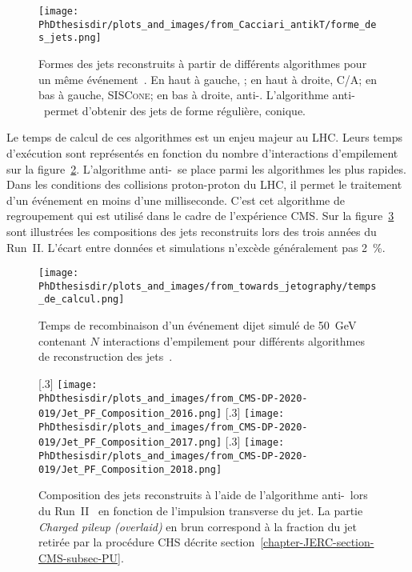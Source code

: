 \begin{figure}[h]
\centering
\texttt{[image: \\PhDthesisdir/plots\_and\_images/from\_Cacciari\_antikT/forme\_des\_jets.png]}
\caption[Formes des jets reconstruits à partir de différents algorithmes.]{Formes des jets reconstruits à partir de différents algorithmes pour un même événement~\cite{Cacciari_antikT}. En haut à gauche, \kT; en haut à droite, C/A; en bas à gauche, \textsc{SISCone}; en bas à droite, anti-\kT. L'algorithme anti-\kT\ permet d'obtenir des jets de forme régulière, conique.}
\label{fig-chapter-JERC-section-jets_reco-subsec-algo-examples}
\end{figure}
\par Le temps de calcul de ces algorithmes est un enjeu majeur au LHC.
Leurs temps d'exécution sont représentés en fonction du nombre d'interactions d'empilement sur la figure~\ref{fig-chapter-JERC-section-jets_reco-subsec-algo-perfs}.
L'algorithme anti-\kT\ se place parmi les algorithmes les plus rapides.
Dans les conditions des collisions proton-proton du LHC, il permet le traitement d'un événement en moins d'une milliseconde.
C'est cet algorithme de regroupement qui est utilisé dans le cadre de l'expérience CMS.
Sur la figure~\ref{fig-Jet_PF_Composition_RunII} sont illustrées les compositions des jets reconstruits lors des trois années du Run~II. L'écart entre données et simulations n'excède généralement pas \SI{2}{\%}.
\begin{figure}[h]
\centering
\texttt{[image: \\PhDthesisdir/plots\_and\_images/from\_towards\_jetography/temps\_de\_calcul.png]}
\caption[Temps de recombinaison d'un événement dijet.]{Temps de recombinaison d'un événement dijet simulé de \SI{50}{\GeV} contenant $N$ interactions d'empilement pour différents algorithmes de reconstruction des jets~\cite{towards_jetography}.}
\label{fig-chapter-JERC-section-jets_reco-subsec-algo-perfs}
\end{figure}
\begin{figure}[h]
\centering
{}[.3\textwidth]
{\texttt{[image: \\PhDthesisdir/plots\_and\_images/from\_CMS-DP-2020-019/Jet\_PF\_Composition\_2016.png]}}
\hfill
{}[.3\textwidth]
{\texttt{[image: \\PhDthesisdir/plots\_and\_images/from\_CMS-DP-2020-019/Jet\_PF\_Composition\_2017.png]}}
\hfill
{}[.3\textwidth]
{\texttt{[image: \\PhDthesisdir/plots\_and\_images/from\_CMS-DP-2020-019/Jet\_PF\_Composition\_2018.png]}}
\caption[Compositions des jets reconstruits lors du Run~II.]{Composition des jets reconstruits à l'aide de l'algorithme anti-\kT\ lors du Run~II~\cite{CMS-DP-2020-019} en fonction de l'impulsion transverse du jet. La partie \emph{Charged pileup (overlaid)} en brun correspond à la fraction du jet retirée par la procédure CHS décrite section~\ref{chapter-JERC-section-CMS-subsec-PU}.}
\label{fig-Jet_PF_Composition_RunII}
\end{figure}
